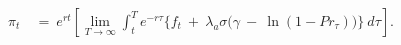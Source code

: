\begin{equation}
\begin{split}
    \pi_{t} \
    & = \ e^{rt} \left[ \lim_{T \to \infty} \int_{t}^{T} e^{-r\tau} \Big\{ f_{t} \ + \ \lambda_{a} \sigma \big( \gamma \ - \ \ln(1 - Pr_{\tau}) \big) \Big\} \ d\tau \right].
\end{split}
\label{Equation:Social-Planners-Problem_Necessary-Conditions_Costate-Variable-with-Integration}
\end{equation}